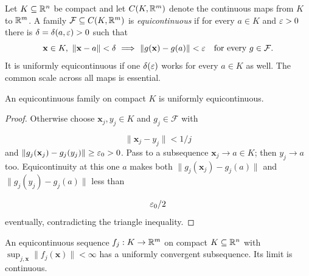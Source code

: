 Let $K\subseteq\mathbb{R}^n$ be compact and let $C(K,\mathbb{R}^m)$ denote the continuous
maps from $K$ to $\mathbb{R}^m$. A family $\mathcal F\subseteq C(K,\mathbb{R}^m)$ is
\emph{equicontinuous} if for every $a\in K$ and $\varepsilon>0$ there is
$\delta=\delta(a,\varepsilon)>0$ such that
\[
\mathbf{x}\in K,\ \|\mathbf{x}-a\|<\delta\ \Longrightarrow\
\|g(\mathbf{x})-g(a)\|<\eps\quad\text{for every }g\in\mathcal F.
\]
It is uniformly equicontinuous if one $\delta(\varepsilon)$ works for every
$a\in K$ as well. The common scale across all maps is essential.
\begin{lemma}\label{lem:compact-equicontinuity}
An equicontinuous family on compact $K$ is uniformly equicontinuous.
\end{lemma}
\begin{proof}
Otherwise choose $\mathbf{x}_j,y_j\in K$ and $g_j\in\mathcal F$ with

\[
\|\mathbf{x}_j-y_j\|<1/j
\]
 and $\|g_j(\mathbf{x}_j)-g_j(y_j)\|\geq\varepsilon_0>0$.
Pass to a subsequence $\mathbf{x}_j\to a\in K$; then $y_j\to a$ too.
Equicontinuity at this one $a$ makes both
$\|g_j(\mathbf{x}_j)-g_j(a)\|$ and $\|g_j(y_j)-g_j(a)\|$ less than

\[
\varepsilon_0/2
\]
 eventually, contradicting the triangle inequality.
\end{proof}
\begin{theorem}\label{thm:finite-arzela-ascoli}
An equicontinuous sequence $f_j:K\to\mathbb{R}^m$ on compact $K\subseteq\mathbb{R}^n$
with $\sup_{j,\mathbf{x}}\|f_j(\mathbf{x})\|<\infty$ has a uniformly convergent subsequence.
Its limit is continuous.
\end{theorem}
